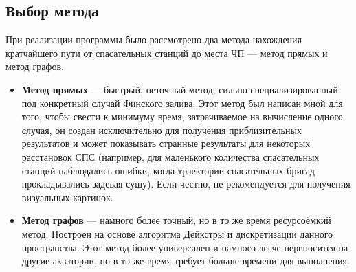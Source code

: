 \documentclass{article}
\begin{document}
\subsection{Выбор метода} При реализации программы было рассмотрено два метода нахождения кратчайшего пути от спасательных станций до места ЧП --- метод прямых и метод графов. 
    \begin{itemize}
        \item \textbf{Метод прямых} --- быстрый, неточный метод, сильно специализированный под конкретный случай Финского залива. Этот метод был написан мной для того, чтобы свести к минимуму время, затрачиваемое на вычисление одного случая, он создан исключительно для получения приблизительных результатов и может показывать странные результаты для некоторых расстановок СПС (например, для маленького количества спасательных станций наблюдались ошибки, когда траектории спасательных бригад прокладывались задевая сушу). Если честно, не рекомендуется для получения визуальных картинок.
        \item \textbf{Метод графов} --- намного более точный, но в то же время ресурсоёмкий метод. Построен на основе алгоритма Дейкстры и дискретизации данного пространства. Этот метод более универсален и намного легче переносится на другие акватории, но в то же время требует больше времени для выполнения.
    \end{itemize}
\end{document}
